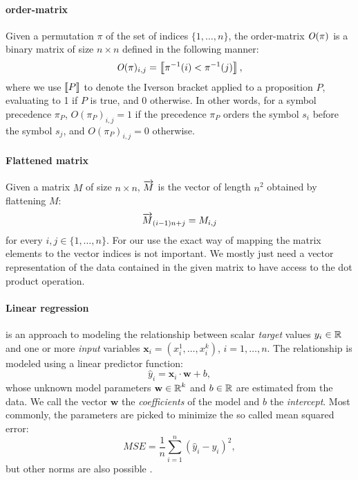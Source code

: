 \documentclass[a4paper]{easychair}
\begin{document}
\paragraph{\Gls*{order-matrix}}
Given a permutation \(\pi\) of the set of indices \(\{1,\ldots,n\}\),
the \gls*{order-matrix} \(\operatorname{\mathit{O}}(\pi)\) is a binary matrix of size \(n \times n\)
defined in the following manner:
\begin{align*}
\operatorname{\mathit{O}}(\pi)_{i, j} = \left \llbracket \pi^{-1}(i) < \pi^{-1}(j) \right \rrbracket,
\end{align*}
where we use \(\left \llbracket P \right \rrbracket\) to denote the Iverson bracket \cite{Iverson1962} applied to a proposition \(P\),
evaluating to 1 if \(P\) is true, and 0 otherwise.
In other words, for a symbol precedence \(\pi_P\), \(O(\pi_P)_{i, j} = 1\) if
the precedence \(\pi_P\) orders the symbol \(s_i\) before the symbol \(s_j\),
and \(O(\pi_P)_{i, j} = 0\) otherwise.

\paragraph{Flattened matrix}
Given a matrix \(M\) of size \(n \times n\),
\(\overrightarrow{M}\) is the vector of length \(n^2\) obtained by flattening \(M\):
\begin{align*}
\overrightarrow{M}_{(i - 1) n + j} = M_{i, j}
\end{align*}
for every \(i,j\in\{1,\ldots,n\}\). For our use the exact way of mapping the 
matrix elements to the vector indices is not important. We mostly just need a vector representation
of the data contained in the given matrix to have access to the dot product operation. %

\paragraph{Linear regression}
is an approach to modeling the relationship between scalar \emph{target} values $y_i \in \operatorname{\mathbb{R}}$
and one or more \emph{input} variables $\mathbf{x}_i = (x^1_i,\ldots,x^k_i)$, $i = 1,\ldots,n$.
The relationship is modeled using a linear predictor function:
\[\hat{y}_i =  \mathbf{x}_i \cdot \mathbf{w} + b, \]
whose unknown model parameters $\mathbf{w}\in \operatorname{\mathbb{R}}^k$ and $b \in \operatorname{\mathbb{R}}$ are estimated from the data.
We call the vector $\mathbf{w}$ the \emph{coefficients} of the model and $b$ the \emph{intercept}.
Most commonly, the parameters are picked to minimize the so called mean squared error:
\[\mathit{MSE} = \frac{1}{n} \sum\limits_{i=1}^n (\hat{y}_i - y_i)^2, \]
but other norms are also possible \cite{hastie01statisticallearning}.
\end{document}
